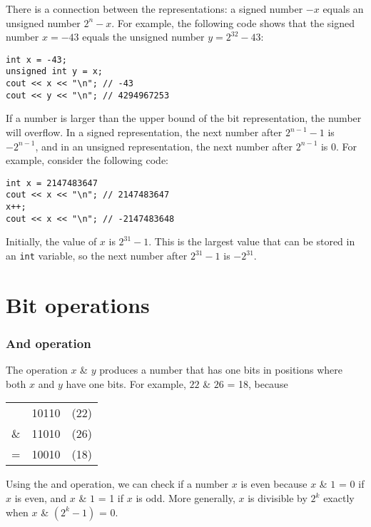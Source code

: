 There is a connection between the
representations:
a signed number $-x$ equals an unsigned number $2^n-x$.
For example, the following code shows that
the signed number $x=-43$ equals the unsigned
number $y=2^{32}-43$:
\begin{lstlisting}
int x = -43;
unsigned int y = x;
cout << x << "\n"; // -43
cout << y << "\n"; // 4294967253
\end{lstlisting}

If a number is larger than the upper bound
of the bit representation, the number will overflow.
In a signed representation,
the next number after $2^{n-1}-1$ is $-2^{n-1}$,
and in an unsigned representation,
the next number after $2^{n-1}$ is $0$.
For example, consider the following code:
\begin{lstlisting}
int x = 2147483647
cout << x << "\n"; // 2147483647
x++;
cout << x << "\n"; // -2147483648
\end{lstlisting}

Initially, the value of $x$ is $2^{31}-1$.
This is the largest value that can be stored
in an \texttt{int} variable,
so the next number after $2^{31}-1$ is $-2^{31}$.


\section{Bit operations}

\newcommand\XOR{\mathbin{\char`\^}}

\subsubsection{And operation}


The  operation $x$ \& $y$ produces a number
that has one bits in positions where both
$x$ and $y$ have one bits.
For example, $22$ \& $26$ = 18, because

\begin{center}
\begin{tabular}{rrr}
& 10110 & (22)\\
\& & 11010 & (26) \\
\hline
 = & 10010 & (18) \\
\end{tabular}
\end{center}

Using the and operation, we can check if a number
$x$ is even because
$x$ \& $1$ = 0 if $x$ is even, and
$x$ \& $1$ = 1 if $x$ is odd.
More generally, $x$ is divisible by $2^k$
exactly when $x$ \& $(2^k-1)$ = 0.

